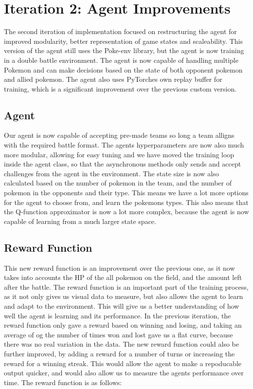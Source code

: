 \section{Iteration 2: Agent Improvements}
\label{sec:Iteration-2-Agent-Environment}
The second iteration of implementation focused on restructuring the agent for improved 
modularity, better representation of game states and scaleability. This version of the agent still
uses the Poke-env library, but the agent is now training in a double battle environment. The
agent is now capable of handling multiple Pokemon and can make decisions based on the state of 
both opponent pokemon and allied pokemon. The agent also uses PyTorches own replay buffer for
training, which is a significant improvement over the previous custom version.

\subsection{Agent}
Our agent is now capable of accepting pre-made teams so long a team alligns with the required battle
format. The agents hyperparameters are now also much more modular, allowing for easy tuning and
we have moved the training loop inside the agent class, so that the asynchronous methods only
sends and accept challenges from the agent in the environment. The state size is now also 
calculated based on the number of pokemon in the team, and the number of pokemon in the opponents 
and their type. This means we have a lot more options for the agent to choose from, and learn 
the pokemons types. This also means that the Q-function approximator is now a lot more complex,
because the agent is now capable of learning from a much larger state space. 


\subsection{Reward Function}
This new reward function is an improvement over the previous one, as it now takes into accounts
the HP of the all pokemon on the field, and the amount left after the battle. The reward function
is an important part of the training process, as it not only gives us visual data to measure, but
also allows the agent to learn and adapt to the environment. This will give us a better understanding
of how well the agent is learning and its performance. In the previous iteration, the reward
function only gave a reward based on winning and losing, and taking an average of og the number of
times won and lost gave us a flat curve, because there was no real variation in the data.
The new reward function could also be further improved, by adding a reward for a number of turns
or increasing the reward for a winning streak. This would allow the agent to make a repoducable output
quicker, and would also allow us to measure the agents performance over time.
The reward function is as follows:



